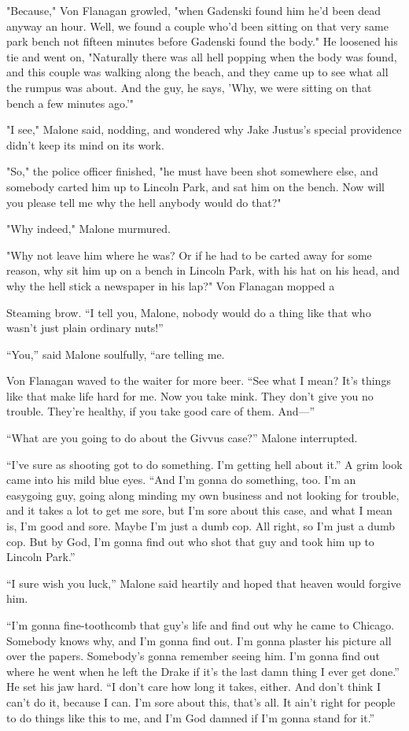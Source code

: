 \documentclass{novel}
\begin{document}
"Because," Von Flanagan growled, "when Gadenski found him he'd been dead anyway an hour. Well, we found a couple who'd been sitting on that very same park bench not fifteen minutes before Gadenski found the body." He loosened his tie and went on, "Naturally there was all hell popping when the body was found, and this couple was walking along the beach, and they came up to see what all the rumpus was about. And the guy, he says, 'Why, we were sitting on that bench a few minutes ago.'"

"I see," Malone said, nodding, and wondered why Jake Justus's special providence didn't keep its mind on its work.

"So," the police officer finished, "he must have been shot somewhere else, and somebody carted him up to Lincoln Park, and sat him on the bench. Now will you please tell me why the hell anybody would do that?"

"Why indeed," Malone murmured.

"Why not leave him where he was? Or if he had to be carted away for some reason, why sit him up on a bench in Lincoln Park, with his hat on his head, and why the hell stick a newspaper in his lap?" Von Flanagan mopped a

Steaming brow. “I tell you, Malone, nobody would do a thing like that who wasn’t just plain ordinary nuts!”

“You,” said Malone soulfully, “are telling me.

Von Flanagan waved to the waiter for more beer. “See what I mean? It’s things like that make life hard for me. Now you take mink. They don’t give you no trouble. They’re healthy, if you take good care of them. And—”

“What are you going to do about the Givvus case?” Malone interrupted.

“I’ve sure as shooting got to do something. I’m getting hell about it.” A grim look came into his mild blue eyes. “And I’m gonna do something, too. I’m an easygoing guy, going along minding my own business and not looking for trouble, and it takes a lot to get me sore, but I’m sore about this case, and what I mean is, I’m good and sore. Maybe I’m just a dumb cop. All right, so I’m just a dumb cop. But by God, I’m gonna find out who shot that guy and took him up to Lincoln Park.”

“I sure wish you luck,” Malone said heartily and hoped that heaven would forgive him.

“I’m gonna fine-toothcomb that guy’s life and find out why he came to Chicago. Somebody knows why, and I’m gonna find out. I’m gonna plaster his picture all over the papers. Somebody’s gonna remember seeing him. I’m gonna find out where he went when he left the Drake if it’s the last damn thing I ever get done.” He set his jaw hard. “I don’t care how long it takes, either. And don’t think I can’t do it, because I can. I’m sore about this, that’s all. It ain’t right for people to do things like this to me, and I’m God damned if I’m gonna stand for it.”
\end{document}

